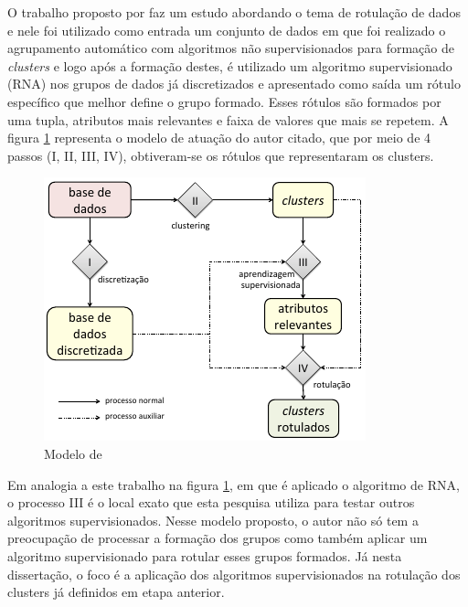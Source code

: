 O trabalho proposto por \cite{Lopes2016} faz um estudo abordando o tema de rotulação de dados e nele foi utilizado como entrada um conjunto de dados em que foi realizado o agrupamento automático com algoritmos não supervisionados para formação de \textit{clusters} e logo após a formação destes, é utilizado um algoritmo supervisionado (RNA) nos grupos de dados já discretizados e apresentado como saída um rótulo específico que melhor define o grupo formado. Esses rótulos são formados por uma tupla, atributos mais relevantes e faixa de valores que mais se repetem. A figura \ref{fig:modeloLOPES} representa o modelo de atuação do autor citado, que por meio de 4 passos (I, II, III, IV),  obtiveram-se os rótulos que representaram os clusters. 
\begin{figure}[h]
        \centering
        \includegraphics[scale=1]{figs/modeloLopes.png}
        \caption{Modelo de \cite{Lopes2016}} 
        \label{fig:modeloLOPES}
\end{figure}

Em analogia a este trabalho na figura \ref{fig:modeloLOPES}, em que é aplicado o algoritmo de RNA, o processo III é o local exato que esta pesquisa utiliza para testar outros algoritmos supervisionados. Nesse modelo proposto, o autor não só tem a preocupação de processar a formação dos grupos como também aplicar um algoritmo supervisionado para rotular esses grupos formados. Já nesta dissertação, o foco é a aplicação dos algoritmos supervisionados na rotulação dos clusters já definidos em etapa anterior. 



